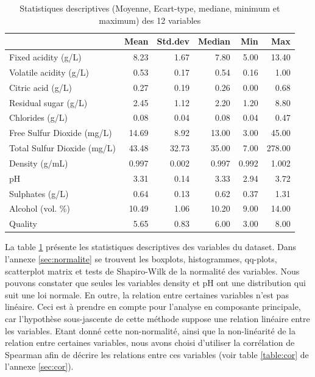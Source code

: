 \documentclass[11pt,a4paper]{article}
\begin{document}
\begin{table}[ht]
	\centering
	\begin{tabular}{lrrrrr}
		\hline
		& Mean & Std.dev & Median & Min & Max \\ 
		\hline
		Fixed acidity (g/L) & 8.23 & 1.67 & 7.80 & 5.00 & 13.40 \\ 
		Volatile acidity (g/L) & 0.53 & 0.17 & 0.54 & 0.16 & 1.00 \\ 
		Citric acid (g/L) & 0.27 & 0.19 & 0.26 & 0.00 & 0.68 \\ 
		Residual sugar (g/L) & 2.45 & 1.12 & 2.20 & 1.20 & 8.80 \\ 
		Chlorides (g/L) & 0.08 & 0.04 & 0.08 & 0.04 & 0.47 \\ 
		Free Sulfur Dioxide (mg/L) & 14.69 & 8.92 & 13.00 & 3.00 & 45.00 \\ 
		Total Sulfur Dioxide (mg/L) & 43.48 & 32.73 & 35.00 & 7.00 & 278.00 \\ 
		Density (g/mL) & 0.997 & 0.002 & 0.997 & 0.992 & 1.002\\ 
		pH & 3.31 & 0.14 & 3.33 & 2.94 & 3.72 \\ 
		Sulphates (g/L) & 0.64 & 0.13 & 0.62 & 0.37 & 1.31 \\ 
		Alcohol (vol. \%) & 10.49 & 1.06 & 10.20 & 9.00 & 14.00 \\ 
		Quality & 5.65 & 0.83 & 6.00 & 3.00 & 8.00 \\ 
		\hline
	\end{tabular}
	\caption{Statistiques descriptives (Moyenne, Ecart-type, mediane, minimum et maximum) des 12 variables}
	\label{table:statdesc}
\end{table}

La table \ref{table:statdesc} présente les statistiques descriptives des variables du dataset.
Dans l'annexe \ref{sec:normalite} se trouvent les boxplots, histogrammes, qq-plots, scatterplot matrix et tests de Shapiro-Wilk de la normalité des variables. Nous pouvons constater que seules les variables density et pH ont une distribution qui suit une loi normale. En outre, la relation entre certaines variables n'est pas linéaire. Ceci est à prendre en compte pour l'analyse en composante principale, car l'hypothèse sous-jascente de cette méthode suppose une relation linéaire entre les variables. Etant donné cette non-normalité, ainsi que la non-linéarité de la relation entre certaines variables, nous avons choisi d'utiliser la corrélation de Spearman afin de décrire les relations entre ces variables (voir table \ref{table:cor} de l'annexe \ref{sec:cor}). 
\end{document}
